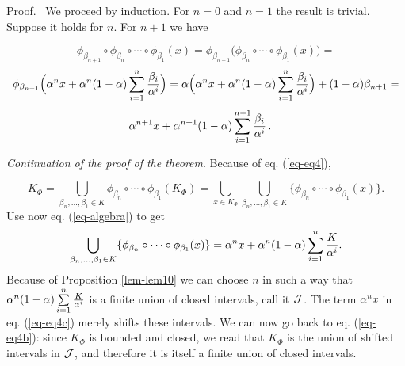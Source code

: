 \documentclass[final,epsfig,amsfont]{article}
\begin{document}
{\smallskip Proof.\ } We proceed by induction. For $n=0$ and $n=1$ the result is trivial. Suppose
it holds for $n$. For $n+1$ we have

$$\phi_{\beta_{n+1}}\circ\phi_{\beta_n}\circ\cdots\circ \phi_{\beta_1}(x)=
\phi_{\beta_{n+1}}\Big(\phi_{\beta_n}\circ\cdots\circ \phi_{\beta_1}(x)\Big)=$$
$$\phi_{\beta_{n+1}}\Big(\alpha^n x+
\alpha^{n} (1-\alpha)\sum\limits_{i=1}^n{\beta_i\over \alpha^i}\Big)=
\alpha \Big(\alpha^n x+
\alpha^{n} (1-\alpha)\sum\limits_{i=1}^n{\beta_i\over \alpha^i}\Big)+(1-\alpha)
\beta_{n+1}=$$
$$\alpha^{n+1} x+
\alpha^{n+1} (1-\alpha)\sum\limits_{i=1}^{n+1}{\beta_i\over \alpha^i}\, . {\quad \vrule height .9ex width .8ex depth -.1ex}
$$

{\em Continuation of the proof of the theorem}. Because of eq. (\ref{eq-eq4}),

\begin{equation}
\label{eq-eq4b}
K_\Phi
={
\bigcup\limits_{\beta_n,\ldots,\beta_1\in K}
\phi_{\beta_n}\circ\cdots\circ \phi_{\beta_1}(K_\Phi) =
\bigcup\limits_{x \in K_\Phi}
\bigcup\limits_{\beta_n,\ldots,\beta_1\in K} \{
\phi_{\beta_n}\circ\cdots\circ \phi_{\beta_1}(x) \}.
}
\end{equation}
Use now eq. (\ref{eq-algebra}) to get
\begin{equation}
\label{eq-eq4c}
\bigcup\limits_{\beta_n,\ldots,\beta_1\in K}
\{
\phi_{\beta_n}\circ\cdots\circ \phi_{\beta_1}(x) \} =
\alpha^n x+
\alpha^{n} (1-\alpha)\sum\limits_{i=1}^n{K\over \alpha^i}.
\end{equation}
Because of Proposition \ref{lem-lem10} we can choose $n$ in such a way that
$\alpha^{n} (1-\alpha)\sum\limits_{i=1}^n{K\over \alpha^i}$ is a finite union of closed intervals, call it $\cal J$. 
The term $\alpha^n x$ in eq. (\ref{eq-eq4c}) merely shifts these intervals. We can now go back to eq. (\ref{eq-eq4b}): since $K_\Phi$ is bounded and closed, we read that $K_\Phi$ is the union of shifted intervals in $\cal J$, and therefore it is itself a finite union of closed intervals.
{\quad \vrule height .9ex width .8ex depth -.1ex}
\end{document}

